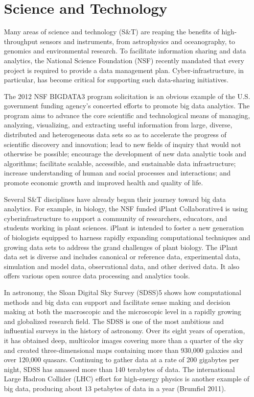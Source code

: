 \section*{Science and Technology}

Many areas of science and technology (S\&T) are reaping the
benefits of high-throughput sensors and instruments, from
astrophysics and oceanography, to genomics and environmental
research. To facilitate information sharing and data
analytics, the National Science Foundation (NSF) recently
mandated that every project is required to provide a data
management plan. Cyber-infrastructure, in particular, has
become critical for supporting such data-sharing initiatives.

The 2012 NSF BIGDATA3
program solicitation is an obvious
example of the U.S. government funding agency’s concerted
efforts to promote big data analytics. The program
aims to advance the core scientific and technological
means of managing, analyzing, visualizing, and extracting
useful information from large, diverse, distributed
and heterogeneous data sets so as to accelerate
the progress of scientific discovery and innovation;
lead to new fields of inquiry that would not
otherwise be possible; encourage the development of
new data analytic tools and algorithms; facilitate
scalable, accessible, and sustainable data infrastructure;
increase understanding of human and social
processes and interactions; and promote economic
growth and improved health and quality of life.

Several S\&T disciplines have already begun their journey
toward big data analytics. For example, in biology, the NSF
funded iPlant Collaborative4
is using cyberinfrastructure to
support a community of researchers, educators, and students
working in plant sciences. iPlant is intended to foster a new
generation of biologists equipped to harness rapidly expanding
computational techniques and growing data sets to
address the grand challenges of plant biology. The iPlant data
set is diverse and includes canonical or reference data,
experimental data, simulation and model data, observational
data, and other derived data. It also offers various open
source data processing and analytics tools.

In astronomy, the Sloan Digital Sky Survey (SDSS)5
shows
how computational methods and big data can support and
facilitate sense making and decision making at both the
macroscopic and the microscopic level in a rapidly growing
and globalized research field. The SDSS is one of the most
ambitious and influential surveys in the history of astronomy.
Over its eight years of operation, it has obtained deep, multicolor
images covering more than a quarter of the sky and
created three-dimensional maps containing more than 930,000
galaxies and over 120,000 quasars. Continuing to gather data
at a rate of 200 gigabytes per night, SDSS has amassed more
than 140 terabytes of data. The international Large Hadron
Collider (LHC) effort for high-energy physics is another
example of big data, producing about 13 petabytes of data in
a year (Brumfiel 2011).